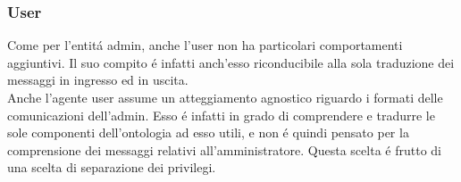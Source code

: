 \subsubsection{User}
Come per l'entit\'a admin, anche l'user non ha particolari comportamenti aggiuntivi. Il suo compito \'e infatti anch'esso riconducibile alla sola traduzione dei messaggi in ingresso ed in uscita.\\
Anche l'agente user assume un atteggiamento agnostico riguardo i formati delle comunicazioni dell'admin. Esso \'e infatti in grado di comprendere e tradurre le sole componenti dell'ontologia ad esso utili, e non \'e quindi pensato per la comprensione dei messaggi relativi all'amministratore. Questa scelta \'e frutto di una scelta di separazione dei privilegi.

